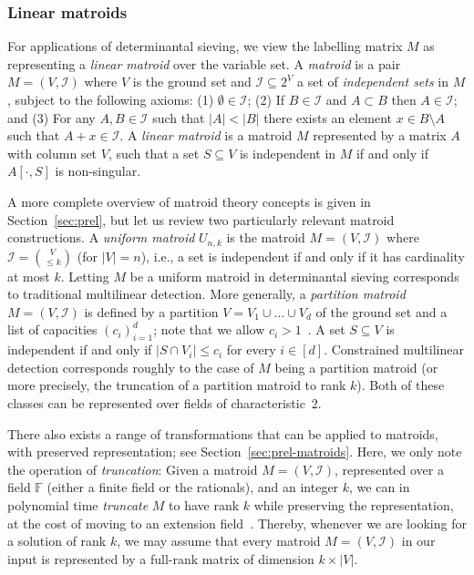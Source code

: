\documentclass{theoretics}
\newcommand{\F}{\ensuremath{\mathbb F}\xspace}
\newcommand{\cI}{\ensuremath{\mathcal I}\xspace}
\begin{document}
\subsubsection{Linear matroids} \label{ssec:matroids}
For applications of determinantal sieving, we view the 
labelling matrix $M$ as representing a \emph{linear matroid} over the
variable set. A \emph{matroid} is a pair $M=(V,\cI)$ where $V$ is the
ground set and $\cI \subseteq 2^V$ a set of \emph{independent sets} in
$M$, subject to the following axioms:
(1) $\emptyset \in \cI$;
(2) If $B \in \cI$ and $A \subset B$ then $A \in \cI$; and 
(3)  For any $A, B \in \cI$ such that $|A|<|B|$ there exists an
  element $x \in B \setminus A$ such that $A+x \in \cI$.
  A \emph{linear matroid} is a matroid $M$ represented by a matrix $A$ with
column set $V$, such that a set $S \subseteq V$ is independent in $M$
if and only if $A[\cdot,S]$ is non-singular. 

A more complete overview of matroid theory concepts is given in
Section~\ref{sec:prel}, but let us review two particularly
relevant matroid constructions. 
A \emph{uniform matroid} $U_{n,k}$ is the matroid $M=(V,\cI)$
  where $\cI=\binom{V}{\leq k}$ (for $|V|=n$), i.e., a set is
  independent if and only if it has cardinality at most $k$.
  Letting $M$ be a uniform matroid in determinantal sieving
  corresponds to traditional multilinear detection.
  More generally, 
  a \emph{partition matroid} $M=(V,\cI)$ is defined by a partition
  $V=V_1 \cup \ldots \cup V_d$ of the ground set and a list of
  capacities $(c_i)_{i=1}^d$; note that we allow $c_i>1$~\cite{OxleyBook}. 
A set $S \subseteq V$ is independent if
  and only if $|S \cap V_i| \leq c_i$ for every $i \in [d]$.
  Constrained multilinear detection corresponds roughly to the case of
  $M$ being a partition matroid (or more precisely, the truncation of
  a partition matroid to rank $k$).
Both of these classes can be represented over fields of characteristic~2.

There also exists a range of transformations that can be applied
to matroids, with preserved representation; see
Section~\ref{sec:prel-matroids}. Here, we only note the 
operation of \emph{truncation}: Given a matroid $M=(V,\cI)$,
represented over a field $\F$ (either a finite field or the rationals), and an integer $k$,
we can in polynomial time \emph{truncate} $M$ to have rank $k$ while preserving the representation,
at the cost of moving to an extension field~\cite{LokshtanovMPS18,Marx09-matroid}.
Thereby, whenever we are looking for a solution of rank $k$,
we may assume that every matroid $M=(V,\cI)$ in our input
is represented by a full-rank matrix of dimension $k \times |V|$.
\end{document}
